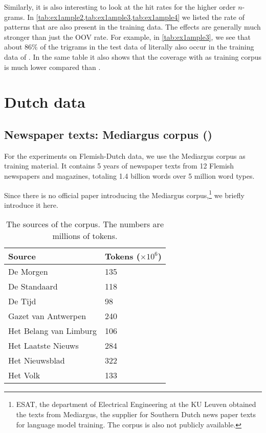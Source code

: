 Similarly, it is also interesting to look at the hit rates for the higher order $n$-grams. In \cref{tab:ex1ample2,tab:ex1ample3,tab:ex1ample4} we listed the rate of patterns that are also present in the training data. The effects are generally much stronger than just the OOV rate. For example, in \cref{tab:ex1ample3}, we see that about 86\% of the trigrams in the test data of \obw literally also occur in the training data of \obw.
In the same table it also shows that the coverage with \emea as training corpus is much lower compared than \obw.
    
\section{Dutch data}
\subsection{Newspaper texts: Mediargus corpus (\mediargus)}
For the experiments on Flemish-Dutch data, we use the Mediargus corpus as training material. It contains 5 years of newspaper texts from 12 Flemish newspapers and magazines, totaling 1.4 billion words over 5 million word types.

Since there is no official paper introducing the Mediargus corpus,\footnote{ESAT, the department of Electrical Engineering at the KU Leuven obtained the texts from Mediargus, the supplier for Southern Dutch news paper texts for language model training. The corpus is also not publicly available.} we briefly introduce it here.

\begin{table}
	\begin{tabular}{ll}
    	Source & \thead{Tokens \\ ($\times 10^6$)} \\ \hline
    	De Morgen & 135 \\
        De Standaard & 118 \\
        De Tijd & 98 \\
        Gazet van Antwerpen & 240 \\
        Het Belang van Limburg & 106 \\
        Het Laatste Nieuws & 284 \\
        Het Nieuwsblad & 322 \\
        Het Volk & 133
    \end{tabular}
    \caption{The sources of the \mediargus corpus. The numbers are millions of tokens.}
\end{table}

